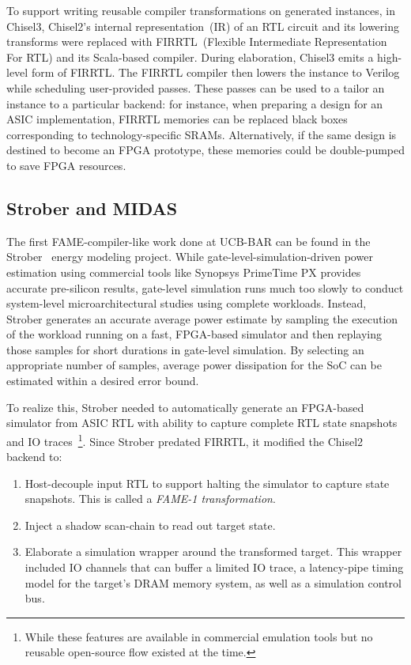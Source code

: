 To support writing reusable compiler transformations on generated instances, in
Chisel3, Chisel2's internal representation~(IR) of an RTL circuit and its
lowering transforms were replaced with FIRRTL~(Flexible Intermediate
Representation For RTL)\cite{FIRRTL} and its Scala-based compiler. During
elaboration, Chisel3 emits a high-level form of FIRRTL. The FIRRTL compiler
then lowers the instance to Verilog while scheduling user-provided passes. These passes can be used to
a tailor an instance to a particular backend: for instance, when preparing a
design for an ASIC implementation, FIRRTL memories can be replaced
black boxes corresponding to technology-specific SRAMs. Alternatively, if the same
design is destined to become an FPGA prototype, these memories could be double-pumped
to save FPGA resources.

\subsection{Strober and MIDAS}\label{sec:midas-intro}

The first FAME-compiler-like work done at UCB-BAR can be found in the
Strober~\cite{Strober} energy modeling project. While
gate-level-simulation-driven power estimation using commercial tools like
Synopsys PrimeTime PX provides accurate pre-silicon results, gate-level
simulation runs much too slowly to conduct system-level microarchitectural studies using
complete workloads. Instead, Strober generates an accurate average power
estimate by sampling the execution of the workload running on a fast,
FPGA-based simulator and then replaying those samples for short durations in
gate-level simulation. By selecting an appropriate number of samples, average
power dissipation for the SoC can be estimated within a desired error bound.

To realize this, Strober needed to automatically generate an FPGA-based
simulator from ASIC RTL with ability to capture complete RTL state snapshots
and IO traces~\footnote{While these features are available in commercial
emulation tools but no reusable open-source flow existed at the time.}.
Since Strober predated FIRRTL, it modified the Chisel2 backend to:
\begin{enumerate}
    \item Host-decouple input RTL to support halting the simulator to capture
        state snapshots. This is called a \emph{FAME-1 transformation}.
    \item Inject a shadow scan-chain to read out target state.
    \item Elaborate a simulation wrapper around the transformed target. This
        wrapper included IO channels that can buffer a limited IO trace, a
        latency-pipe timing model for the target's DRAM memory system, as well
        as a simulation control bus.
\end{enumerate}

